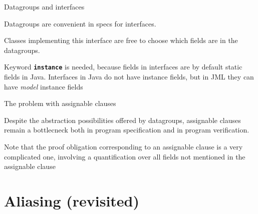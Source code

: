 \documentclass[
pdf,
nocolorBG,
slideColor,
erik,
]{prosper}
\newcommand{\code}[1]{{\rm \texttt{\textbf{\small #1}}}}
\begin{document}
\begin{slide}{Datagroups and interfaces}
\vspace*{-4ex}

Datagroups are convenient in specs for interfaces.



Classes implementing this interface are free to choose which fields
are in the datagroups.

{\scriptsize\rm Keyword \texttt{\textbf{instance}} is needed, because fields in interfaces
are by default static fields in Java.
Interfaces in Java do not have instance fields,
but in JML they can have \textit{model} instance fields
}


\end{slide}


\begin{slide}{The problem with assignable clauses}
\vspace*{-4ex}

Despite the abstraction possibilities offered by datagroups,
assignable clauses remain a bottlecneck both in program specification
and in program verification.

\medskip

{\scriptsize\rm Note that the proof obligation corresponding to an assignable
clause is a very complicated one, involving a quantification
over all fields not mentioned in the assignable clause}

\end{slide}



\part{{\Large \red Aliasing (revisited)}}
\end{document}
